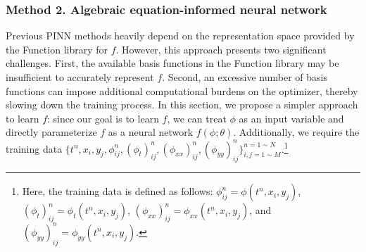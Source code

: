 \subsubsection{Method 2. Algebraic equation-informed neural network}

Previous PINN methods heavily depend on the representation space provided by the Function library for $f$. However, this approach presents two significant challenges. First, the available basis functions in the Function library may be insufficient to accurately represent $f$. Second, an excessive number of basis functions can impose additional computational burdens on the optimizer, thereby slowing down the training process.  In this section, we propose a simpler approach to learn \( f \): since our goal is to learn \( f \), we can treat \( \phi \) as an input variable and directly parameterize \( f \) as a neural network \( f(\phi; \theta) \). Additionally, we require the training data \( \{t^{n}, x_{i}, y_{j}, \phi_{ij}^{n}, (\phi_{t})_{ij}^{n}, (\phi_{xx})_{ij}^{n}, (\phi_{yy})_{ij}^{n} \}^{n = 1 \sim N}_{i,j = 1 \sim M} \).\footnote{Here, the training data is defined as follows: \( \phi^{n}_{ij} = \phi(t^{n}, x_{i}, y_{j}) \), \( (\phi_{t})^{n}_{ij} = \phi_{t}(t^{n}, x_{i}, y_{j}) \), \( (\phi_{xx})^{n}_{ij} = \phi_{xx}(t^{n}, x_{i}, y_{j}) \), and \( (\phi_{yy})^{n}_{ij} = \phi_{yy}(t^{n}, x_{i}, y_{j}) \).}

